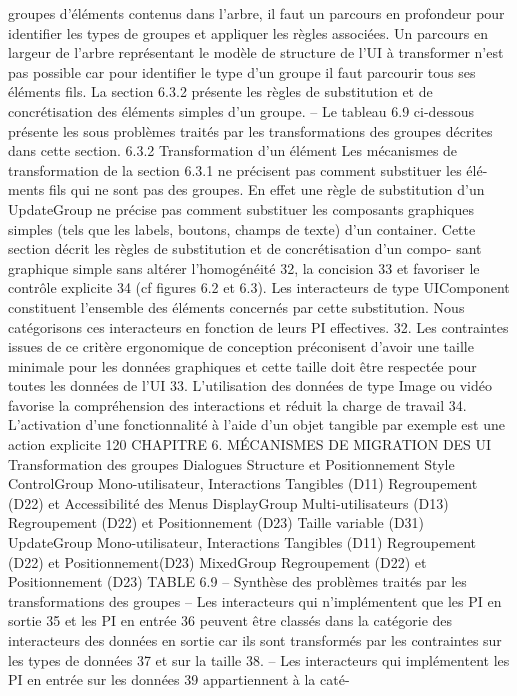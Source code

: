 \documentclass{article}
\begin{document}
groupes d’éléments contenus dans l’arbre, il faut un parcours en profondeur pour identiﬁer les
types de groupes et appliquer les règles associées. Un parcours en largeur de l’arbre représentant
le modèle de structure de l’UI à transformer n’est pas possible car pour identiﬁer le type d’un
groupe il faut parcourir tous ses éléments ﬁls. La section 6.3.2 présente les règles de substitution
et de concrétisation des éléments simples d’un groupe.
– Le tableau 6.9 ci-dessous présente les sous problèmes traités par les transformations des groupes
décrites dans cette section.
6.3.2
Transformation d’un élément
Les mécanismes de transformation de la section 6.3.1 ne précisent pas comment substituer les élé-
ments ﬁls qui ne sont pas des groupes. En effet une règle de substitution d’un UpdateGroup ne précise
pas comment substituer les composants graphiques simples (tels que les labels, boutons, champs de
texte) d’un container. Cette section décrit les règles de substitution et de concrétisation d’un compo-
sant graphique simple sans altérer l’homogénéité 32, la concision 33 et favoriser le contrôle explicite 34
(cf ﬁgures 6.2 et 6.3).
Les interacteurs de type UIComponent constituent l’ensemble des éléments concernés par cette
substitution. Nous catégorisons ces interacteurs en fonction de leurs PI effectives.
32. Les contraintes issues de ce critère ergonomique de conception préconisent d’avoir une taille minimale pour les
données graphiques et cette taille doit être respectée pour toutes les données de l’UI
33. L’utilisation des données de type Image ou vidéo favorise la compréhension des interactions et réduit la charge de
travail
34. L’activation d’une fonctionnalité à l’aide d’un objet tangible par exemple est une action explicite
120
CHAPITRE 6. MÉCANISMES DE MIGRATION DES UI
Transformation des
groupes
Dialogues
Structure et
Positionnement
Style
ControlGroup
Mono-utilisateur,
Interactions Tangibles
(D11)
Regroupement (D22)
et Accessibilité des
Menus
DisplayGroup
Multi-utilisateurs
(D13)
Regroupement (D22)
et Positionnement
(D23)
Taille variable (D31)
UpdateGroup
Mono-utilisateur,
Interactions Tangibles
(D11)
Regroupement (D22)
et
Positionnement(D23)
MixedGroup
Regroupement (D22)
et Positionnement
(D23)
TABLE 6.9 – Synthèse des problèmes traités par les transformations des groupes
– Les interacteurs qui n’implémentent que les PI en sortie 35 et les PI en entrée 36 peuvent être
classés dans la catégorie des interacteurs des données en sortie car ils sont transformés par
les contraintes sur les types de données 37 et sur la taille 38.
– Les interacteurs qui implémentent les PI en entrée sur les données 39 appartiennent à la caté-
\end{document}
